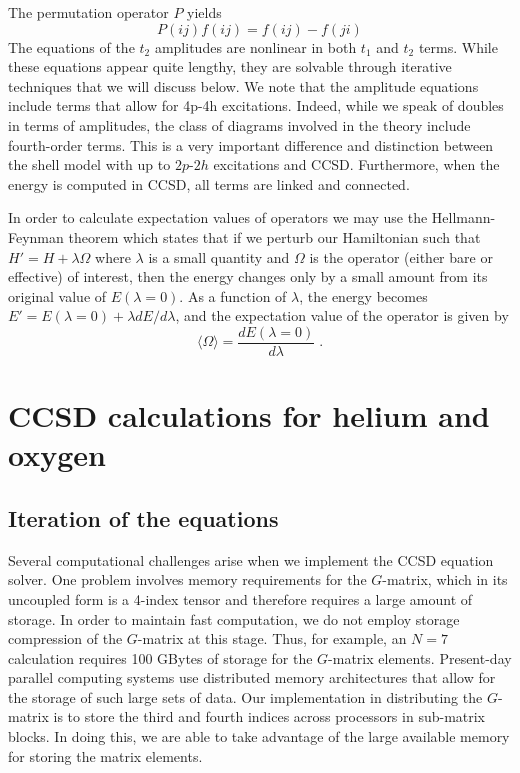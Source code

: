 The permutation operator $P$ yields
\begin{equation}
P(ij)f(ij) = f(ij) - f(ji)
\end{equation}
The equations of the $t_2$ amplitudes are nonlinear in both $t_1$ and
$t_2$ terms. While these equations appear quite lengthy, they are 
solvable through iterative techniques that we will discuss below. 
We note that the amplitude equations include terms that allow for 
4p-4h excitations. Indeed, while we speak of doubles in terms of 
amplitudes, the class of diagrams involved in the theory include 
fourth-order terms. This is a very important difference 
and distinction between the shell model with up to 
$2p$-$2h$ excitations and CCSD. Furthermore, when
the energy is computed in CCSD, all terms are linked and connected. 

In order to calculate expectation values of operators we may use the 
Hellmann-Feynman theorem \cite{feynman} which states that if we 
perturb our Hamiltonian such that $H'=H+\lambda \Omega$ where $\lambda$ is a
small quantity and $\Omega$ is the operator (either bare or effective) 
of interest, then the
energy changes only by a small amount from its original value of 
$E(\lambda=0)$.  As a function of $\lambda$, the energy becomes
$E'=E(\lambda=0)+\lambda dE/d\lambda$, 
and the expectation value of the operator is given by 
\begin{equation}
\langle \Omega \rangle =\frac{dE(\lambda=0)}{d\lambda} \;.
\label{helfeyn}
\end{equation}

\section{CCSD calculations for helium and oxygen}
\label{sec:results}

\subsection{Iteration of the equations}

Several computational challenges arise when we implement the CCSD
equation solver. One problem involves memory requirements for the 
$G$-matrix, which in its uncoupled form is a 4-index tensor and 
therefore requires a large amount of storage. In order to maintain
fast computation, we do not employ storage compression of the $G$-matrix
at this stage. Thus, for example, 
an $N=7$ calculation requires 100 GBytes of storage for
the $G$-matrix elements. 
Present-day parallel 
computing systems use distributed memory architectures that allow for
the storage of such large sets of data. Our implementation in distributing
the $G$-matrix is to store the third and fourth indices across processors in
sub-matrix blocks. In doing this, we are able to take advantage of 
the large available memory for storing the matrix elements. 


